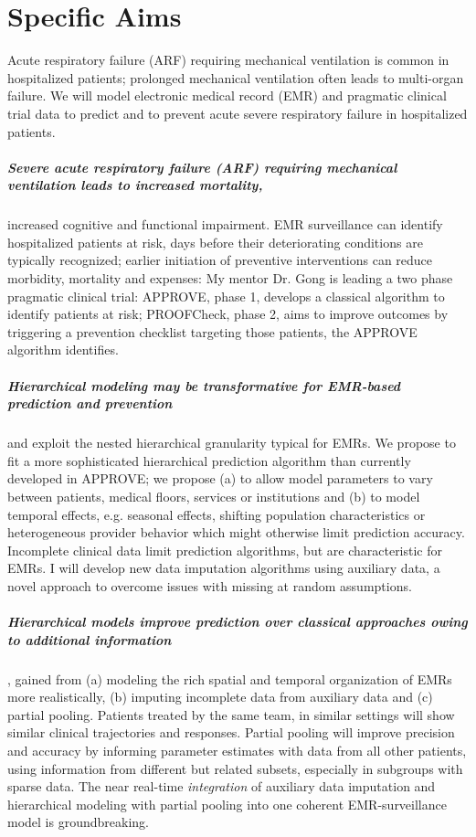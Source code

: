 \documentclass[11pt,notitlepage]{article}
\begin{document}
\section*{Specific Aims}
Acute respiratory failure (ARF) requiring mechanical ventilation is common in hospitalized patients; prolonged mechanical ventilation often leads to multi-organ failure. We will model electronic medical record (EMR) and pragmatic clinical trial data to predict and to prevent acute severe respiratory failure in hospitalized patients.

\subparagraph{Severe acute respiratory failure (ARF) requiring mechanical ventilation leads to increased mortality,} increased cognitive and functional impairment. EMR surveillance can identify hospitalized patients at risk, days before their deteriorating conditions are typically recognized; earlier initiation of preventive interventions can reduce morbidity, mortality and expenses: My mentor Dr. Gong is leading a two phase pragmatic clinical trial: APPROVE, phase 1, develops a classical algorithm to identify patients at risk; PROOFCheck, phase 2, aims to improve outcomes by triggering a prevention checklist targeting those patients, the APPROVE algorithm identifies. 

\subparagraph{Hierarchical modeling may be transformative for EMR-based prediction and prevention} and exploit the nested hierarchical granularity typical for EMRs. We propose to fit a more sophisticated hierarchical prediction algorithm than currently developed in APPROVE; we propose (a) to allow model parameters to vary between patients, medical floors, services or institutions and (b) to model temporal effects, e.g. seasonal effects, shifting population characteristics or heterogeneous provider behavior which might otherwise limit prediction accuracy. Incomplete clinical data limit prediction algorithms, but are characteristic for EMRs. I will develop new data imputation algorithms using auxiliary data, a novel approach to overcome issues with missing at random assumptions. 

\subparagraph{Hierarchical models improve prediction over classical approaches owing to additional information}, gained from (a) modeling the rich spatial and temporal organization of EMRs more realistically, (b) imputing incomplete data from auxiliary data and (c) partial pooling. Patients treated by the same team, in similar settings will show similar clinical trajectories and responses. Partial pooling will improve precision and accuracy by informing parameter estimates with data from all other patients, using information from different but related subsets, especially in subgroups with sparse data. The near real-time \textit{integration} of auxiliary data imputation and hierarchical modeling with partial pooling into one coherent EMR-surveillance model is groundbreaking. 
\end{document}
